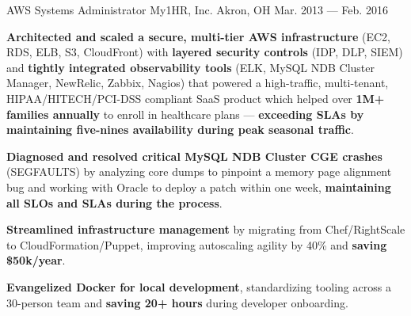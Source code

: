 \begin{cventries}
    \cventry
        { AWS Systems Administrator }
        { My1HR, Inc. }
        { Akron, OH }
        { Mar. 2013 --- Feb. 2016 }
        {
            \begin{cvitems}
                \item{\textbf{Architected and scaled a secure, multi-tier AWS infrastructure} (EC2, RDS, ELB, S3, CloudFront) with \textbf{layered security controls} (IDP, DLP, SIEM) and \textbf{tightly integrated observability tools} (ELK, MySQL NDB Cluster Manager, NewRelic, Zabbix, Nagios) that powered a high-traffic, multi-tenant, HIPAA/HITECH/PCI-DSS compliant SaaS product which helped over \textbf{1M+ families annually} to enroll in healthcare plans --- \textbf{exceeding SLAs by maintaining five-nines availability during peak seasonal traffic}.}
                \item{\textbf{Diagnosed and resolved critical MySQL NDB Cluster CGE crashes} (SEGFAULTS) by analyzing core dumps to pinpoint a memory page alignment bug and working with Oracle to deploy a patch within one week, \textbf{maintaining all SLOs and SLAs during the process}.}
                \item{\textbf{Streamlined infrastructure management} by migrating from Chef/RightScale to CloudFormation/Puppet, improving autoscaling agility by 40\% and \textbf{saving \$50k/year}.}
                \item{\textbf{Evangelized Docker for local development}, standardizing tooling across a 30-person team and \textbf{saving 20+ hours} during developer onboarding.}
            \end{cvitems}
        }
\end{cventries}


